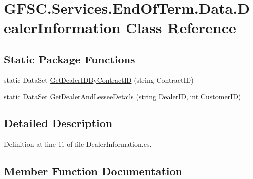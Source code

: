 \hypertarget{class_g_f_s_c_1_1_services_1_1_end_of_term_1_1_data_1_1_dealer_information}{}\section{G\+F\+S\+C.\+Services.\+End\+Of\+Term.\+Data.\+Dealer\+Information Class Reference}
\label{class_g_f_s_c_1_1_services_1_1_end_of_term_1_1_data_1_1_dealer_information}
\subsection*{Static Package Functions}
\begin{DoxyCompactItemize}
\item 
static Data\+Set \mbox{\hyperlink{class_g_f_s_c_1_1_services_1_1_end_of_term_1_1_data_1_1_dealer_information_ad375c4647275317383243ef5afaf07a0}{Get\+Dealer\+I\+D\+By\+Contract\+ID}} (string Contract\+ID)
\item 
static Data\+Set \mbox{\hyperlink{class_g_f_s_c_1_1_services_1_1_end_of_term_1_1_data_1_1_dealer_information_a6ec1ee14263363ad33f48c4e6a1255a5}{Get\+Dealer\+And\+Lessee\+Details}} (string Dealer\+ID, int Customer\+ID)
\end{DoxyCompactItemize}


\subsection{Detailed Description}


Definition at line 11 of file Dealer\+Information.\+cs.



\subsection{Member Function Documentation}
\mbox{\label{class_g_f_s_c_1_1_services_1_1_end_of_term_1_1_data_1_1_dealer_information_a6ec1ee14263363ad33f48c4e6a1255a5}} 
